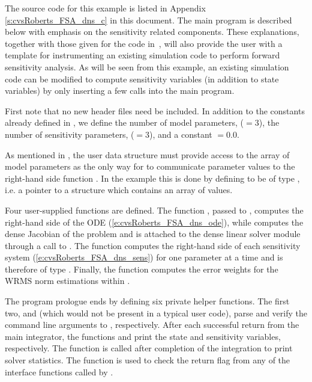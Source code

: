 The source code for this example is listed in Appendix \ref{s:cvsRoberts_FSA_dns_c}
in this document.
The main program is described below with emphasis on the sensitivity related components. 
These explanations, together with those given for the code 
in~\cite{cvode_ex}, will also provide the user with a template for instrumenting 
an existing simulation code to perform forward sensitivity analysis.
As will be seen from this example, an existing simulation code can be modified to compute 
sensitivity variables (in addition to state variables) by only inserting a few {\cvodes} 
calls into the main program. 

First note that no new header files need be included. In addition to the constants already
defined in , we define the number of model parameters,  ($=3$),
the number of sensitivity parameters,  ($=3$), and a constant  $=0.0$. 

As mentioned in , the user data structure 
must provide access to the array of model parameters as the only way for
{\cvodes} to communicate parameter values to the right-hand side function
. In the  example this is done by defining
 to be of type , i.e. a pointer to a structure which contains
an array of   values.

Four user-supplied functions are defined. The function , passed to ,
computes the right-hand side of the ODE (\ref{e:cvsRoberts_FSA_dns_ode}), while
 computes the dense Jacobian of the problem and is attached to the
dense linear solver module {\cvdense} through a call to .
The function  computes the right-hand side of each sensitivity system
(\ref{e:cvsRoberts_FSA_dns_sens}) for one parameter at a time and is therefore of type
. Finally, the function  computes the error weights for the WRMS norm
estimations within {\cvodes}.

The program prologue ends by defining six private helper functions.  The first two,
 and  (which would not be present in a typical user code),
parse and verify the command line arguments to , respectively.
After each successful return from the main {\cvodes} integrator, the functions 
 and  print the state and sensitivity variables,
respectively. The function  is called after completion of the
integration to print solver statistics.
The function  is used to check the return flag from any of the
{\cvodes} interface functions called by .

